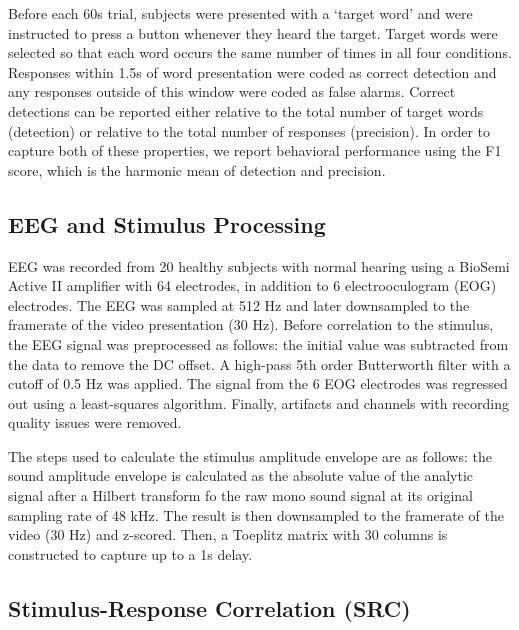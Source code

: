 \documentclass[10pt,letterpaper]{article}
\begin{document}
  Before each 60s trial, subjects were presented with a `target word' and 
  were instructed to press a button whenever they heard the target. Target 
  words were selected so that each word occurs the same number of times
  in all four conditions. Responses within 1.5s of word presentation 
  were coded as correct detection and any responses outside of this window
  were coded as false alarms. Correct detections can be reported either 
  relative to the total number of target words (detection) or relative 
  to the total number of responses (precision). In order to capture 
  both of these properties, we report behavioral performance using the 
  F1 score, which is the harmonic mean of detection and precision.
  

\subsection{EEG and Stimulus Processing}

  EEG was recorded from 20 healthy subjects with normal hearing
  using a BioSemi Active II amplifier with 64 electrodes, in addition to 6
  electrooculogram (EOG) electrodes. The EEG was sampled at 512 Hz and 
  later downsampled to the framerate of the video presentation (30 Hz).
  Before correlation to the stimulus, the EEG signal was preprocessed as 
  follows: the initial value was subtracted from the data to remove the 
  DC offset. A high-pass 5th order Butterworth filter with a cutoff of 
  0.5 Hz was applied. The signal from the 6 EOG electrodes was regressed 
  out using a least-squares algorithm. Finally, artifacts and channels 
  with recording quality issues were removed.

  The steps used to calculate the stimulus amplitude envelope are as follows:
  the sound amplitude envelope is calculated as the absolute value of the 
  analytic signal after a Hilbert transform fo the raw mono sound signal 
  at its original sampling rate of 48 kHz. The result is then downsampled
  to the framerate of the video (30 Hz) and z-scored. Then, a Toeplitz matrix
  with 30 columns is constructed to capture up to a 1s delay.
  
\subsection{Stimulus-Response Correlation (SRC)}

\end{document}
